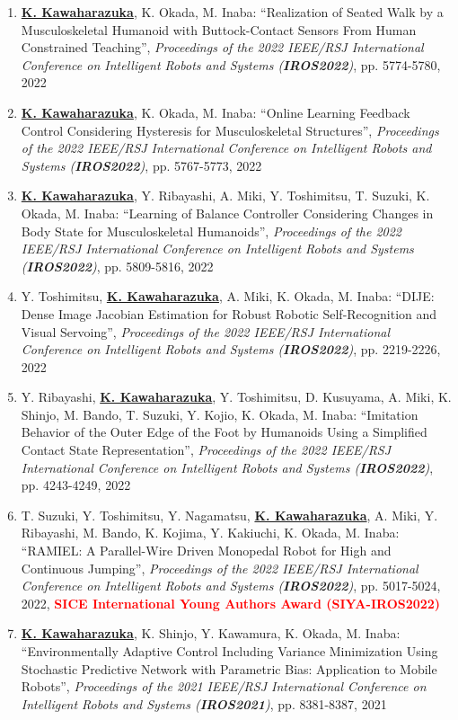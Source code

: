 \documentclass[letterpaper]{article}
\begin{document}
\begin{enumerate}
\item \underline{\textbf{K. Kawaharazuka}}, K. Okada, M. Inaba: ``Realization of Seated Walk by a Musculoskeletal Humanoid with Buttock-Contact Sensors From Human Constrained Teaching'', \textit{Proceedings of the 2022 IEEE/RSJ International Conference on Intelligent Robots and Systems (\textit{\textbf{IROS2022}})}, pp. 5774-5780, 2022
\item \underline{\textbf{K. Kawaharazuka}}, K. Okada, M. Inaba: ``Online Learning Feedback Control Considering Hysteresis for Musculoskeletal Structures'', \textit{Proceedings of the 2022 IEEE/RSJ International Conference on Intelligent Robots and Systems (\textit{\textbf{IROS2022}})}, pp. 5767-5773, 2022
\item \underline{\textbf{K. Kawaharazuka}}, Y. Ribayashi, A. Miki, Y. Toshimitsu, T. Suzuki, K. Okada, M. Inaba: ``Learning of Balance Controller Considering Changes in Body State for Musculoskeletal Humanoids'', \textit{Proceedings of the 2022 IEEE/RSJ International Conference on Intelligent Robots and Systems (\textit{\textbf{IROS2022}})}, pp. 5809-5816, 2022
\item Y. Toshimitsu, \underline{\textbf{K. Kawaharazuka}}, A. Miki, K. Okada, M. Inaba: ``DIJE: Dense Image Jacobian Estimation for Robust Robotic Self-Recognition and Visual Servoing'', \textit{Proceedings of the 2022 IEEE/RSJ International Conference on Intelligent Robots and Systems (\textit{\textbf{IROS2022}})}, pp. 2219-2226, 2022
\item Y. Ribayashi, \underline{\textbf{K. Kawaharazuka}}, Y. Toshimitsu, D. Kusuyama, A. Miki, K. Shinjo, M. Bando, T. Suzuki, Y. Kojio, K. Okada, M. Inaba: ``Imitation Behavior of the Outer Edge of the Foot by Humanoids Using a Simplified Contact State Representation'', \textit{Proceedings of the 2022 IEEE/RSJ International Conference on Intelligent Robots and Systems (\textit{\textbf{IROS2022}})}, pp. 4243-4249, 2022
\item T. Suzuki, Y. Toshimitsu, Y. Nagamatsu, \underline{\textbf{K. Kawaharazuka}}, A. Miki, Y. Ribayashi, M. Bando, K. Kojima, Y. Kakiuchi, K. Okada, M. Inaba: ``RAMIEL: A Parallel-Wire Driven Monopedal Robot for High and Continuous Jumping'', \textit{Proceedings of the 2022 IEEE/RSJ International Conference on Intelligent Robots and Systems (\textit{\textbf{IROS2022}})}, pp. 5017-5024, 2022, \textbf{\textcolor{red}{SICE International Young Authors Award (SIYA-IROS2022)}}
\item \underline{\textbf{K. Kawaharazuka}}, K. Shinjo, Y. Kawamura, K. Okada, M. Inaba: ``Environmentally Adaptive Control Including Variance Minimization Using Stochastic Predictive Network with Parametric Bias: Application to Mobile Robots'', \textit{Proceedings of the 2021 IEEE/RSJ International Conference on Intelligent Robots and Systems (\textit{\textbf{IROS2021}})}, pp. 8381-8387, 2021

\end{enumerate}
\end{document}
